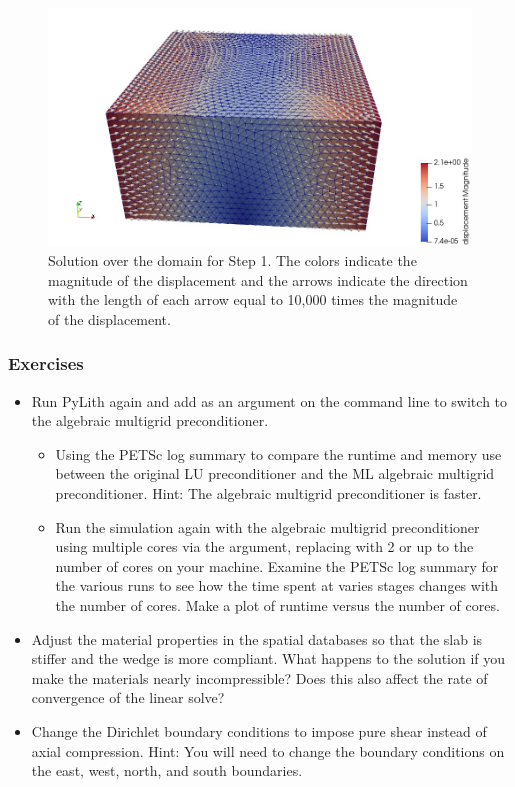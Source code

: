 \begin{figure}
  \includegraphics[width=5.0in]{examples/figs/subduction3d_step01_soln}
  \caption{Solution over the domain for Step 1. The colors indicate
    the magnitude of the displacement and the arrows indicate the
    direction with the length of each arrow equal to 10,000 times the
    magnitude of the displacement.}
  \label{fig:example:subduction:3d:step01}
\end{figure}

\subsubsection{Exercises}

\begin{itemize}
\item Run PyLith again and add
   as an argument on the
  command line to switch to the algebraic multigrid preconditioner.
  \begin{itemize}
  \item Using the PETSc log summary to compare the runtime and memory
    use between the original LU preconditioner and the ML algebraic
    multigrid preconditioner. Hint: The algebraic multigrid
    preconditioner is faster.
  \item Run the simulation again with the algebraic multigrid
    preconditioner using multiple cores via the
     argument, replacing
     with 2 or up to the number of cores on your
    machine. Examine the PETSc log summary for the various runs to see
    how the time spent at varies stages changes with the number of
    cores. Make a plot of runtime versus the number of cores.
  \end{itemize}
\item Adjust the material properties in the spatial databases so that
  the slab is stiffer and the wedge is more compliant. What happens to
  the solution if you make the materials nearly incompressible? Does
  this also affect the rate of convergence of the linear solve?
\item Change the Dirichlet boundary conditions to impose pure shear
  instead of axial compression. Hint: You will need to change the
  boundary conditions on the east, west, north, and south boundaries.
\end{itemize}
    

